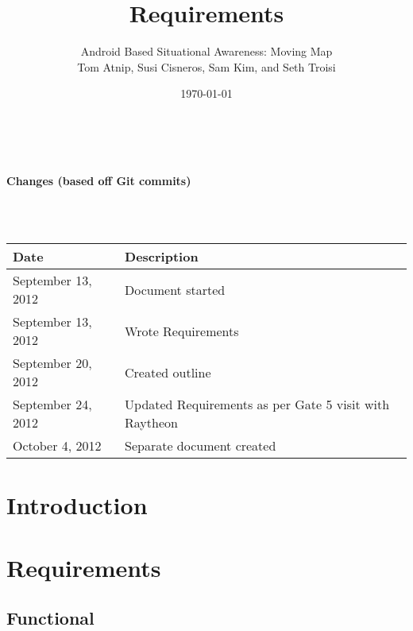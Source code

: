 \documentclass{article}
\begin{document}
\setlength{\voffset}{3.5in}
\title{Requirements}
\author{\Large Android Based Situational Awareness: Moving Map\\
Tom Atnip, Susi Cisneros, Sam Kim, and Seth Troisi}
\date{\today}
\maketitle
\clearpage
\setlength{\voffset}{0pt}
\tableofcontents
\clearpage
~\\
\begin{Large}\textbf{Changes (based off Git commits)}\end{Large}\\
~\\
\begin{tabular}{ | p{1.5in} | p{4.5in} | }
\hline
\textbf{Date} & \textbf{Description}\\
\hline
\hline
September 13, 2012 & Document started\\
\hline
September 13, 2012 & Wrote Requirements\\
\hline
September 20, 2012 & Created outline\\
\hline
September 24, 2012 & Updated Requirements as per Gate 5 visit with Raytheon\\
\hline
October 4, 2012 & Separate document created\\
\hline
\end{tabular}
\clearpage

\section{Introduction}

\section{Requirements}

\subsection{Functional}
\end{document}
